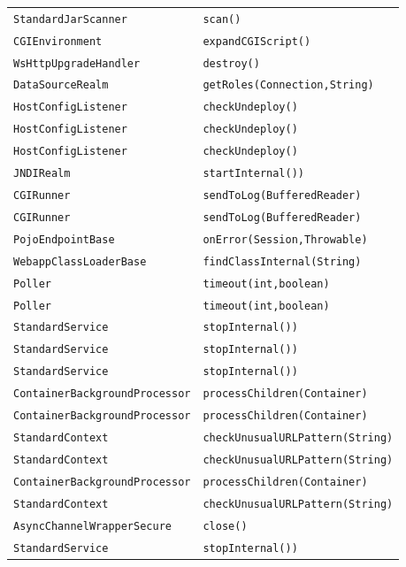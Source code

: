 \begin{center}
\begin{longtable}{ll}
\lstinline/StandardJarScanner/&{\lstinline/scan()/}\\
\lstinline/CGIEnvironment/&{\lstinline/expandCGIScript()/}\\
\lstinline/WsHttpUpgradeHandler/&{\lstinline/destroy()/}\\
\lstinline/DataSourceRealm/&{\lstinline/getRoles(Connection,String)/}\\
\lstinline/HostConfigListener/&{\lstinline/checkUndeploy()/}\\
\lstinline/HostConfigListener/&{\lstinline/checkUndeploy()/}\\
\lstinline/HostConfigListener/&{\lstinline/checkUndeploy()/}\\
\lstinline/JNDIRealm/&{\lstinline/startInternal())/}\\
\lstinline/CGIRunner/&{\lstinline/sendToLog(BufferedReader)/}\\
\lstinline/CGIRunner/&{\lstinline/sendToLog(BufferedReader)/}\\
\lstinline/PojoEndpointBase/&{\lstinline/onError(Session,Throwable)/}\\
\lstinline/WebappClassLoaderBase/&{\lstinline/findClassInternal(String)/}\\
\lstinline/Poller/&{\lstinline/timeout(int,boolean)/}\\
\lstinline/Poller/&{\lstinline/timeout(int,boolean)/}\\
\lstinline/StandardService/&{\lstinline/stopInternal())/}\\
\lstinline/StandardService/&{\lstinline/stopInternal())/}\\
\lstinline/StandardService/&{\lstinline/stopInternal())/}\\
\lstinline/ContainerBackgroundProcessor/&{\lstinline/processChildren(Container)/}\\
\lstinline/ContainerBackgroundProcessor/&{\lstinline/processChildren(Container)/}\\
\lstinline/StandardContext/&{\lstinline/checkUnusualURLPattern(String)/}\\
\lstinline/StandardContext/&{\lstinline/checkUnusualURLPattern(String)/}\\
\lstinline/ContainerBackgroundProcessor/&{\lstinline/processChildren(Container)/}\\
\lstinline/StandardContext/&{\lstinline/checkUnusualURLPattern(String)/}\\
\lstinline/AsyncChannelWrapperSecure/&{\lstinline/close()/}\\
\lstinline/StandardService/&{\lstinline/stopInternal())/}\\

\end{longtable}
\end{center}
